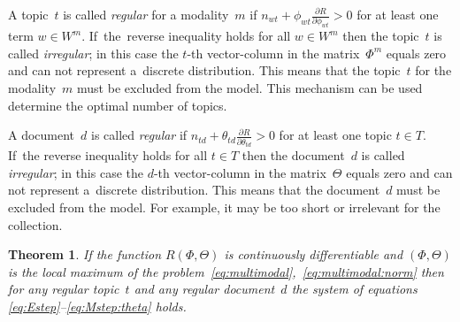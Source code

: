 \documentclass{acm_proc_article-sp}
\newtheorem{theorem}{Theorem}
\begin{document}
A topic~$t$ is called \emph{regular} for a modality~$m$
if $n_{wt} + \phi_{wt} \frac{\partial R}{\partial \phi_{wt}} > 0$
for at least one term ${w\in W^m}$.
If~the~reverse inequality holds for all ${w\in W^m}$ then
the topic~$t$ is called \emph{irregular};
in this case the $t$-th vector-column in the matrix~$\Phi^m$ equals zero
and can not represent a~discrete distribution.
This means that the topic~$t$ for the modality~$m$ must be excluded from the model.
This mechanism can be used determine the optimal number of topics.

A document~$d$ is called \emph{regular}
if $n_{td} + \theta_{td} \frac{\partial R}{\partial \theta_{td}} > 0$
for at least one topic ${t\in T}$.
If~the reverse inequality holds for all ${t\in T}$ then
the document~$d$ is called \emph{irregular};
in this case the $d$-th vector-column in the matrix~$\Theta$ equals zero
and can not represent a~discrete distribution.
This means that the document~$d$ must be excluded from the model.
For example, it may be too short or irrelevant for the collection.

\begin{theorem}
\label{th:multimodal}
    If the function $R(\Phi,\Theta)$ is continuously differentiable
    and $(\Phi,\Theta)$ is the local maximum
    of the problem~\eqref{eq:multimodal},~\eqref{eq:multimodal:norm}
    then for any regular topic~$t$ and any regular document~$d$
    the system of equations \eqref{eq:Estep}--\eqref{eq:Mstep:theta} holds.
\end{theorem}
\end{document}
